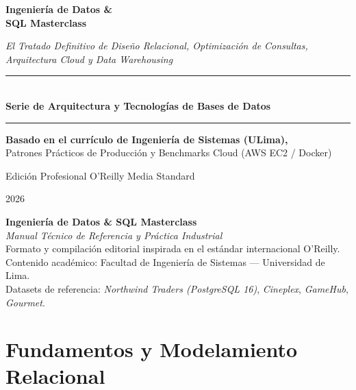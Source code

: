 \documentclass[11pt,a4paper,openany]{report}
\begin{document}
\begin{titlepage}
    \centering
    \vspace*{2cm}
    {\Huge\bfseries\color{oreillyred} Ingenier\'ia de Datos \&\\ SQL Masterclass\par}
    \vspace{0.8cm}
    {\Large\itshape El Tratado Definitivo de Dise\~no Relacional, Optimizaci\'on de Consultas, Arquitectura Cloud y Data Warehousing\par}
    \vspace{2.5cm}
    
    \rule{0.8\textwidth}{1.5pt}\\[0.4cm]
    {\large\bfseries Serie de Arquitectura y Tecnolog\'ias de Bases de Datos}\\[0.2cm]
    \rule{0.8\textwidth}{1.5pt}
    
    \vfill
    {\large\textbf{Basado en el curr\'iculo de Ingenier\'ia de Sistemas (ULima),}\\
    Patrones Pr\'acticos de Producci\'on y Benchmarks Cloud (AWS EC2 / Docker)\par}
    \vspace{1.5cm}
    {\large Edici\'on Profesional O'Reilly Media Standard\par}
    \vspace{0.5cm}
    {\small 2026}
\end{titlepage}

\newpage
\thispagestyle{empty}
\vspace*{12cm}
\noindent\textbf{Ingenier\'ia de Datos \& SQL Masterclass}\\
\textit{Manual T\'ecnico de Referencia y Pr\'actica Industrial}\\
Formato y compilaci\'on editorial inspirada en el est\'andar internacional O'Reilly.\\
Contenido acad\'emico: Facultad de Ingenier\'ia de Sistemas — Universidad de Lima.\\
Datasets de referencia: \textit{Northwind Traders (PostgreSQL 16)}, \textit{Cineplex}, \textit{GameHub}, \textit{Gourmet}.

\tableofcontents

\part{Fundamentos y Modelamiento Relacional}






\end{document}

